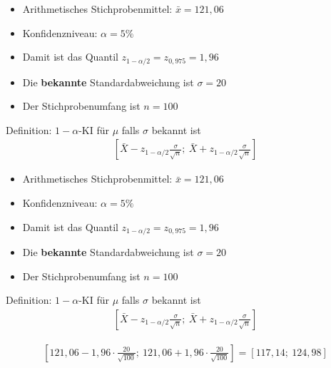 \documentclass[t,11pt]{beamer}
\begin{document}
\begin{frame}
\begin{itemize}
	\item Arithmetisches Stichprobenmittel: $\bar{x} = 121,06$
	\item Konfidenzniveau: $\alpha=5\%$
	\item Damit ist das Quantil $z_{1-\alpha/2}=z_{0,975}=1,96$
	\item Die \textbf{bekannte} Standardabweichung ist $\sigma=20$
	\item Der Stichprobenumfang ist $n=100$
\end{itemize}
\begin{alertblock}{Definition: $1-\alpha$-KI für $\mu$ falls $\sigma$ bekannt ist}
	\begin{align*}
	\left[ \bar{X} - z_{1-\alpha/2} \frac{\sigma}{\sqrt{n}};~\bar{X} + z_{1-\alpha/2} \frac{\sigma}{\sqrt{n}}  \right]
	\end{align*}
\end{alertblock}
\end{frame}

\begin{frame}
\begin{itemize}
	\item Arithmetisches Stichprobenmittel: $\bar{x} = 121,06$
	\item Konfidenzniveau: $\alpha=5\%$
	\item Damit ist das Quantil $z_{1-\alpha/2}=z_{0,975}=1,96$
	\item Die \textbf{bekannte} Standardabweichung ist $\sigma=20$
	\item Der Stichprobenumfang ist $n=100$
\end{itemize}
\begin{alertblock}{Definition: $1-\alpha$-KI für $\mu$ falls $\sigma$ bekannt ist}
	\begin{align*}
	\left[ \bar{X} - z_{1-\alpha/2} \frac{\sigma}{\sqrt{n}};~\bar{X} + z_{1-\alpha/2} \frac{\sigma}{\sqrt{n}}  \right]
	\end{align*}
\end{alertblock}
\begin{align*}
\left[ 121,06 - 1,96\cdot \frac{20}{\sqrt{100}};~ 121,06 + 1,96\cdot \frac{20}{\sqrt{100}} \right] = \left[ 117,14;~124,98 \right]
\end{align*}
\end{frame}
\end{document}

